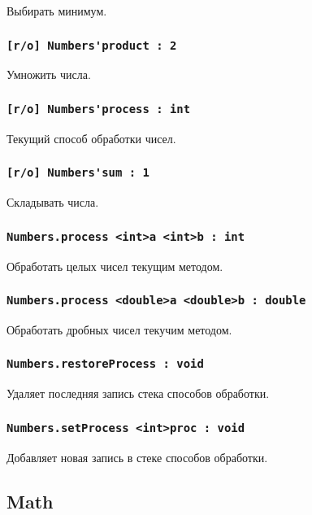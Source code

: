 Выбирать минимум.

\subsubsection{\lstinline|[r/o] Numbers'product : 2|}

Умножить числа.

\subsubsection{\lstinline|[r/o] Numbers'process : int|}

Текущий способ обработки чисел.

\subsubsection{\lstinline|[r/o] Numbers'sum : 1|}

Складывать числа.

\subsubsection{\lstinline|Numbers.process <int>a <int>b : int|}

Обработать целых чисел текущим методом.

\subsubsection{\lstinline|Numbers.process <double>a <double>b : double|}

Обработать дробных чисел текучим методом.

\subsubsection{\lstinline|Numbers.restoreProcess : void|}

Удаляет последняя запись стека способов обработки.

\subsubsection{\lstinline|Numbers.setProcess <int>proc : void|}

Добавляет новая запись в стеке способов обработки.

\subsection{{\color{orange} Math}}

